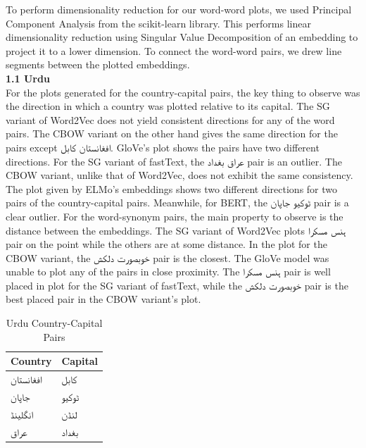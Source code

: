 \documentclass[format=acmsmall,review=true,screen=true]{acmart}
\begin{document}
To perform dimensionality reduction for our word-word plots, we used Principal Component Analysis from the scikit-learn library. This performs linear dimensionality reduction using Singular Value Decomposition of an embedding to project it to a lower dimension. To connect the word-word pairs, we drew line segments between the plotted embeddings.\\

\textbf{1.1 Urdu}\\

For the plots generated for the country-capital pairs, the key thing to observe was the direction in which a country was plotted relative to its capital. The SG variant of Word2Vec does not yield consistent directions for any of the word pairs. The CBOW variant on the other hand gives the same direction for the pairs except \texturdu{افغانستان  کابل}. GloVe’s plot shows the pairs have two different directions. For the SG variant of fastText, the \texturdu{عراق  بغداد} pair is an outlier. The CBOW variant, unlike that of Word2Vec, does not exhibit the same consistency. The plot given by ELMo’s embeddings shows two different directions for two pairs of the country-capital pairs. Meanwhile, for BERT, the \texturdu{ ٹوکیو جاپان} pair is a clear outlier.
For the word-synonym pairs, the main property to observe is the distance between the embeddings. The SG variant of Word2Vec plots \texturdu{ ہنس  مسکرا} pair on the point while the others are at some distance. In the plot for the CBOW variant, the \texturdu{خوبصورت دلکش} pair is the closest. The GloVe model was unable to plot any of the pairs in close proximity. The \texturdu{ ہنس  مسکرا} pair is well placed in plot for the SG variant of fastText, while the \texturdu{ خوبصورت دلکش} pair is the best placed pair in the CBOW variant’s plot.\\

    \begin{table}[]
    \begin{tabular}{|l|l|}
        \hline
                            \textbf{Country} & \textbf{Capital}    \\
    \hline
    \texturdu{افغانستان}             &      \texturdu{کابل}\\
       \hline
    \hline
    \texturdu{جاپان}             &      \texturdu{ٹوکیو}\\
       \hline
    \hline
    \texturdu{انگلینڈ}             &      \texturdu{لنڈن}\\
       \hline
    \hline
    \texturdu{عراق}             &      \texturdu{بغداد}\\
       \hline
    \end{tabular}
                \caption{\label{tab:table-name}Urdu Country-Capital Pairs}
    \end{table}
    
\end{document}
